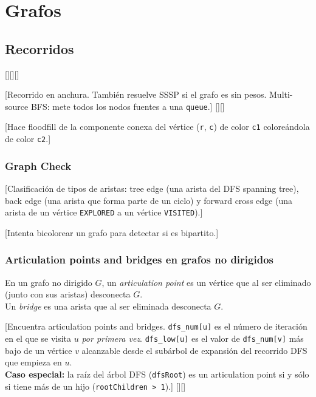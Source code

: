 \chapter{Grafos}

\section{Recorridos}
	[][][]
	
	[Recorrido en anchura. También resuelve SSSP si el grafo es sin pesos. Multi-source BFS: mete todos los nodos fuentes a una \texttt{queue}.]%
	[][]
	
	[Hace floodfill de la componente conexa del vértice (\texttt{r}, \texttt{c}) de color \texttt{c1} coloreándola de color \texttt{c2}.]
\medskip
\subsection{Graph Check}
	[Clasificación de tipos de aristas: tree edge (una arista del DFS spanning tree), back edge (una arista que forma parte de un ciclo) y forward cross edge (una arista de un vértice \texttt{EXPLORED} a un vértice \texttt{VISITED}).]
	
	[Intenta bicolorear un grafo para detectar si es bipartito.]

\medskip
\subsection{Articulation points and bridges en grafos no dirigidos}
	En un grafo no dirigido $G$, un \textit{articulation point} es un vértice que al ser eliminado (junto con sus aristas) desconecta $G$.\\
	Un \textit{bridge} es una arista que al ser eliminada desconecta $G$.

	[Encuentra articulation points and bridges. \texttt{dfs\_num[u]} es el número de iteración en el que se visita $u$ \textit{por primera vez}. \texttt{dfs\_low[u]} es el valor de \texttt{dfs\_num[v]} más bajo de un vértice $v$ alcanzable desde el subárbol de expansión del recorrido DFS que empieza en $u$.\\
	\textbf{Caso especial:} la raíz del árbol DFS (\texttt{dfsRoot}) es un articulation point si y sólo si tiene más de un hijo (\texttt{rootChildren > 1}).]%
	[][]

